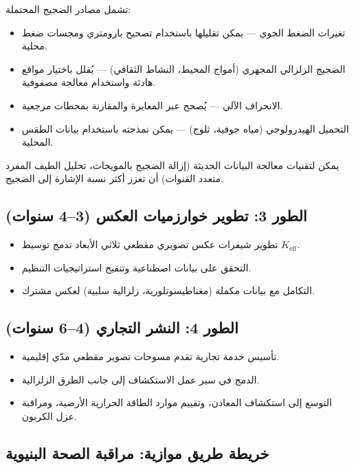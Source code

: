 \documentclass[12pt,a4paper]{article}
\newcommand{\Keff}{K_{\mathrm{eff}}}
\theoremstyle{remark}
\begin{document}
	تشمل مصادر الضجيج المحتملة:
	\begin{itemize}
		\item تغيرات الضغط الجوي — يمكن تقليلها باستخدام تصحيح بارومتري ومجسات ضغط محلية.
		\item الضجيج الزلزالي المجهري (أمواج المحيط، النشاط الثقافي) — يُقلل باختيار مواقع هادئة واستخدام معالجة مصفوفية.
		\item الانحراف الآلي — يُصحح عبر المعايرة والمقارنة بمحطات مرجعية.
		\item التحميل الهيدرولوجي (مياه جوفية، ثلوج) — يمكن نمذجته باستخدام بيانات الطقس المحلية.
	\end{itemize}
	
	يمكن لتقنيات معالجة البيانات الحديثة (إزالة الضجيج بالمويجات، تحليل الطيف المفرد متعدد القنوات) أن تعزز أكثر نسبة الإشارة إلى الضجيج.
	
	\subsection{الطور 3: تطوير خوارزميات العكس (3–4 سنوات)}
	
	\begin{itemize}
		\item تطوير شيفرات عكس تصويري مقطعي ثلاثي الأبعاد تدمج توسيط \(\Keff\).
		\item التحقق على بيانات اصطناعية وتنقيح استراتيجيات التنظيم.
		\item التكامل مع بيانات مكملة (مغناطيسوتلورية، زلزالية سلبية) لعكس مشترك.
	\end{itemize}
	
	\subsection{الطور 4: النشر التجاري (4–6 سنوات)}
	
	\begin{itemize}
		\item تأسيس خدمة تجارية تقدم مسوحات تصوير مقطعي مدّي إقليمية.
		\item الدمج في سير عمل الاستكشاف إلى جانب الطرق الزلزالية.
		\item التوسع إلى استكشاف المعادن، وتقييم موارد الطاقة الحرارية الأرضية، ومراقبة عزل الكربون.
	\end{itemize}
	
	\subsection{خريطة طريق موازية: مراقبة الصحة البنيوية}
	
\end{document}
